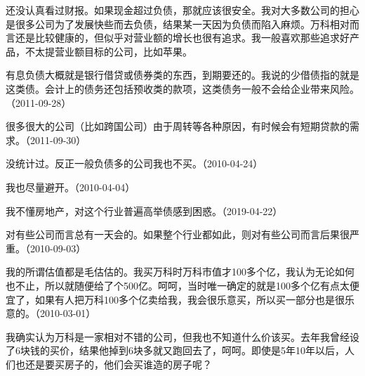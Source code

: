 
还没认真看过财报。如果现金超过负债，那就应该很安全。我对大多数公司的担心是很多公司为了发展快些而去负债，结果某一天因为负债而陷入麻烦。万科相对而言还是比较健康的，但似乎对营业额的增长也很有追求。我一般喜欢那些追求好产品，不太提营业额目标的公司，比如苹果。


有息负债大概就是银行借贷或债券类的东西，到期要还的。我说的少借债指的就是这类债。会计上的债务还包括预收类的款项，这类债务一般不会给企业带来风险。（2011-09-28）


很多很大的公司（比如跨国公司）由于周转等各种原因，有时候会有短期贷款的需求。（2011-09-30）


没统计过。反正一般负债多的公司我也不买。（2010-04-24）


我也尽量避开。（2010-04-04）


我不懂房地产，对这个行业普遍高举债感到困惑。（2019-04-22）


对有些公司而言总有一天会的。如果整个行业都如此，则对有些公司而言后果很严重。（2010-09-03）


我的所谓估值都是毛估估的。我买万科时万科市值才100多个亿，我认为无论如何也不止，所以就随便给了个500亿。呵呵，当时唯一确定的就是100多个亿有点太便宜了，如果有人把万科100多个亿卖给我，我会很乐意买，所以买一部分也是很乐意的。（2010-03-01）


我确实认为万科是一家相对不错的公司，但我也不知道什么价该买。去年我曾经设了6块钱的买价，结果他掉到6块多就又跑回去了，呵呵。即使是5年10年以后，人们也还是要买房子的，他们会买谁造的房子呢？

